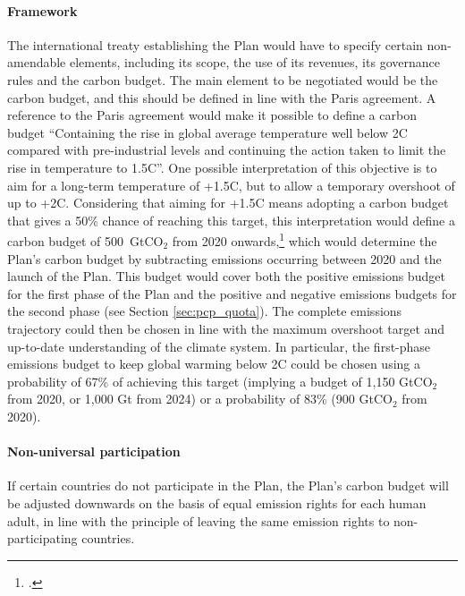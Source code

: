\documentclass[a5paper,english,openany]{memoir}
\begin{document}
\paragraph{Framework} %
The international treaty establishing the Plan would have to specify certain non-amendable elements, including its scope, the use of its revenues, its governance rules and the carbon budget. The main element to be negotiated would be the carbon budget, and this should be defined in line with the Paris agreement. A reference to the Paris agreement would make it possible to define a carbon budget ``Containing the rise in global average temperature well below 2\textdegree{}C compared with pre-industrial levels and continuing the action taken to limit the rise in temperature to 1.5\textdegree{}C''. One possible interpretation of this objective is to aim for a long-term temperature of +1.5\textdegree{}C, but to allow a temporary overshoot of up to +2\textdegree{}C. 
Considering that aiming for +1.5\textdegree{}C means adopting a carbon budget that gives a 50\% chance of reaching this target, this interpretation would define a carbon budget of 500~GtCO$_\text{2}$ from 2020 onwards,\footnote{\citet{ipcc_climate_2021}.} 
which would determine the Plan's carbon budget by subtracting emissions occurring between 2020 and the launch of the Plan. This budget would cover both the positive emissions budget for the first phase of the Plan and the positive and negative emissions budgets for the second phase (see Section \ref{sec:pcp_quota}). 
The complete emissions trajectory 
could then be chosen in line with the maximum overshoot target and up-to-date understanding of the climate system. 
In particular, the first-phase emissions budget to keep global warming below 2\textdegree{}C could be chosen using a probability of 67\% of achieving this target (implying a budget of 1,150 GtCO$_\text{2}$ from 2020, or 1,000 Gt from 2024) or a probability of 83\% (900 GtCO$_\text{2}$ from 2020). 

\paragraph{Non-universal participation}
If certain countries do not participate in the Plan, the Plan's carbon budget will be adjusted downwards on the basis of equal emission rights for each human adult, in line with the principle of leaving the same emission rights to non-participating countries. %
\end{document}
